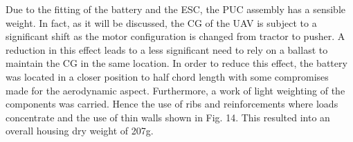 \documentclass[../../main.tex]{subfiles}
\begin{document}

Due to the fitting of the battery and the ESC, the PUC assembly has a sensible weight.
In fact, as it will be discussed, the CG of the UAV is subject to a significant shift as the motor configuration is changed from tractor to pusher.
A reduction in this effect leads to a less significant need to rely on a ballast to maintain the CG in the same location. 
In order to reduce this effect, the battery was located in a closer position to half chord length with some compromises made for the aerodynamic aspect.
Furthermore, a work of light weighting of the components was carried.
Hence the use of ribs and reinforcements where loads concentrate and the use of thin walls shown in Fig. 14.
This resulted into an overall housing dry weight of 207g. 

\end{document}
